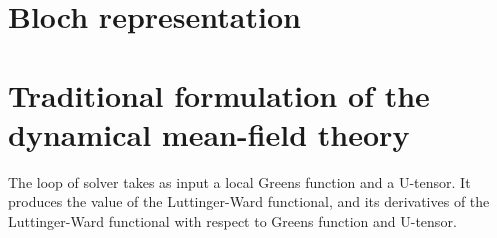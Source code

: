 \documentclass[11pt,a4paper]{report}
\begin{document}




\chapter{Bloch representation}



\chapter{Traditional formulation of the dynamical mean-field theory}
The loop of solver takes as input a local Greens function and a
U-tensor. It produces the value of the Luttinger-Ward functional, and
its derivatives of the Luttinger-Ward functional with respect to
Greens function and U-tensor.
\end{document}
